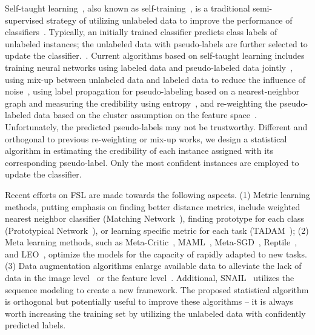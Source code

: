 \documentclass[10pt,letterpaper,twocolumn]{article}
\newcommand{\mypar}[1]{\smallskip\noindent {\bf #1}\enskip}
\begin{document}
Self-taught learning~\cite{self-taught-learning}, also known as self-training~\cite{NoisyStudent},
is a traditional semi-supervised strategy of utilizing unlabeled data to improve the performance of classifiers~\cite{amini2002semi,grandvalet2005semi}. 
Typically, an initially trained classifier predicts class labels of unlabeled instances; the  unlabeled data with  pseudo-labels are further selected to update the classifier.~\cite{lee2013pseudo}. 
Current algorithms based on self-taught learning includes training neural networks using labeled data and pseudo-labeled data jointly~\cite{lee2013pseudo}, 
using mix-up between unlabeled data and labeled data to reduce the influence of noise~\cite{arazo2019pseudo}, 
using label propagation for pseudo-labeling based on a nearest-neighbor graph and measuring the credibility using entropy~\cite{iscen2019label},
and re-weighting the pseudo-labeled data based on the cluster assumption on the feature space~\cite{shi2018transductive}. 
Unfortunately, the predicted pseudo-labels may not be trustworthy.
Different and orthogonal to previous re-weighting or mix-up works,  we design a statistical algorithm in estimating the credibility of each instance assigned with its corresponding pseudo-label. Only the most confident instances are employed to update the classifier.

\mypar{Few-shot learning.}
Recent efforts on FSL are made towards the following aspects.
(1) Metric learning methods, putting emphasis on finding better distance metrics, 
include weighted nearest neighbor classifier (\eg Matching Network~\cite{vinyals2016matching}), 
finding prototype for each class (\eg Prototypical Network~\cite{snell2017prototypical}),
or learning specific metric for each task (\eg TADAM~\cite{oreshkin2018tadam});
(2) Meta learning methods, such as Meta-Critic~\cite{sung2017learning}, MAML~\cite{finn2017model}, Meta-SGD~\cite{li2017meta}, Reptile~\cite{nichol2018first}, and LEO~\cite{rusu2018meta},  optimize the models for the capacity of rapidly adapted to new tasks. 
(3) Data augmentation algorithms enlarge available data to alleviate the lack of data in the image level~\cite{chen2019image} or the feature level~\cite{ren2018meta}. Additional, SNAIL~\cite{mishra2017simple} utilizes the sequence modeling to create a new framework.
The proposed statistical algorithm is orthogonal but potentially useful to improve these algorithms -- it is always worth increasing the training set by utilizing the unlabeled data with confidently predicted labels.
\end{document}
